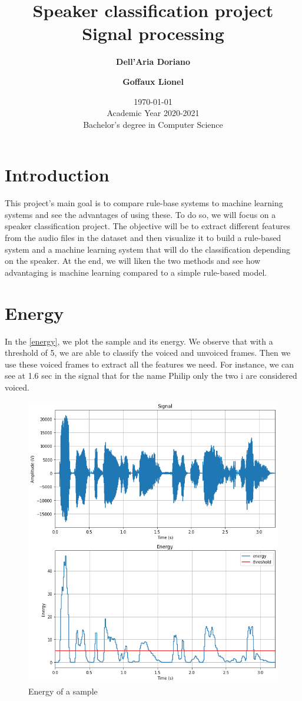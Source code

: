\documentclass[]{article}
\title{
{\Huge Speaker classification project}\\
Signal processing\\
}
\author{
\textbf{Dell’Aria Doriano}
\and
\textbf{Goffaux Lionel}\\
}
\date{\today\\
Academic Year 2020-2021\\
Bachelor's degree in Computer Science\\}
\begin{document}
\maketitle
\pagebreak


\section{Introduction}
This project's main goal is to compare rule-base systems to machine learning systems and see
the advantages of using these. To do so, we will focus on a speaker classification project.
The objective will be to extract different features from the audio files in the dataset and
then visualize it to build a rule-based system and a machine learning system that will do
the classification depending on the speaker. At the end, we will liken the two methods
and see how advantaging is machine learning compared to a simple rule-based model.

\section{Energy}
In the \autoref{energy}, we plot the sample and its energy. We observe that with a threshold of 5,
we are able to classify the voiced and unvoiced frames.
Then we use these voiced frames to extract all the features we need.
For instance, we can see at 1.6 sec in the signal that for the name Philip only the two i are
considered voiced. 


\begin{figure}[H]
    \centering
    \caption{\label{energy}Energy of a sample}
    \includegraphics[scale=0.5]{images/energy_threshold.png}
\end{figure}
\end{document}
